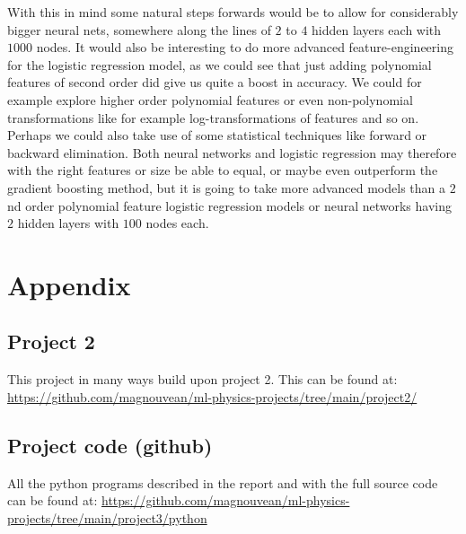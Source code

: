 \documentclass{article}
\begin{document}
With this in mind some natural steps forwards would be to allow for considerably
bigger neural nets, somewhere along the lines of $2$ to $4$ hidden layers each
with $1000$ nodes. It would also be interesting to do more advanced
feature-engineering for the logistic regression model, as we could see that just
adding polynomial features of second order did give us quite a boost in
accuracy. We could for example explore higher order polynomial features or even
non-polynomial transformations like for example log-transformations of features
and so on. Perhaps we could also take use of some statistical techniques like
forward or backward elimination. Both neural networks and logistic regression
may therefore with the right features or size be able to equal, or maybe even
outperform the gradient boosting method, but it is going to take more advanced
models than a $2$nd order polynomial feature logistic regression models or
neural networks having $2$ hidden layers with $100$ nodes each.

\section{Appendix}

\subsection{Project 2}
This project in many ways build upon project 2. This can be found at:
\url{https://github.com/magnouvean/ml-physics-projects/tree/main/project2/}

\subsection{Project code (github)}
All the python programs described in the report and with the full source code can be
found at:
\url{https://github.com/magnouvean/ml-physics-projects/tree/main/project3/python}


\end{document}
